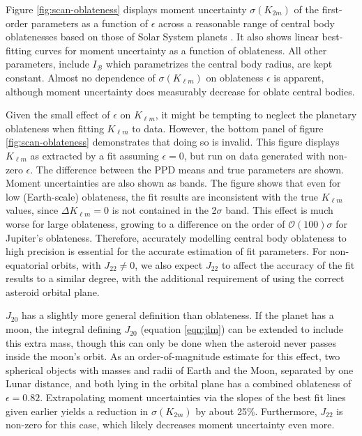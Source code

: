 \documentclass[fleqn,usenatbib]{mnras}
\begin{document}
Figure \ref{fig:scan-oblateness} displays moment uncertainty $\sigma(K_{2 m})$ of the first-order parameters as a function of $\epsilon$ across a reasonable range of central body oblatenesses based on those of Solar System planets \cite{paterLissauer2015}. It also shows linear best-fitting curves for moment uncertainty as a function of oblateness. All other parameters, include $I_\mathcal{B}$ which parametrizes the central body radius, are kept constant. Almost no dependence of $\sigma(K_{\ell m})$ on oblateness $\epsilon$ is apparent, although moment uncertainty does measurably decrease for oblate central bodies.

Given the small effect of $\epsilon$ on $K_{\ell m}$, it might be tempting to neglect the planetary oblateness when fitting $K_{\ell m}$ to data. However, the bottom panel of figure \ref{fig:scan-oblateness} demonstrates that doing so is invalid. This figure displays $K_{\ell m}$ as extracted by a fit assuming $\epsilon = 0$, but run on data generated with non-zero $\epsilon$. The difference between the PPD means and true parameters are shown. Moment uncertainties are also shown as bands. The figure shows that even for low (Earth-scale) oblateness, the fit results are inconsistent with the true $K_{\ell m}$ values, since $\Delta K_{\ell m} = 0$ is not contained in the 2$\sigma$ band. This effect is much worse for large oblateness, growing to a difference on the order of $\mathcal{O}(100)\sigma$ for Jupiter's oblateness. Therefore, accurately modelling central body oblateness to high precision is essential for the accurate estimation of fit parameters. For non-equatorial orbits, with $J_{22} \neq 0$, we also expect $J_{22}$ to affect the accuracy of the fit results to a similar degree, with the additional requirement of using the correct asteroid orbital plane.

$J_{20}$ has a slightly more general definition than oblateness. If the planet has a moon, the integral defining $J_{20}$ (equation \ref{eqn:jlm}) can be extended to include this extra mass, though this can only be done when the asteroid never passes inside the moon's orbit. As an order-of-magnitude estimate for this effect, two spherical objects with masses and radii of Earth and the Moon, separated by one Lunar distance, and both lying in the orbital plane has a combined oblateness of $\epsilon = 0.82$. Extrapolating moment uncertainties via the slopes of the best fit lines given earlier yields a reduction in $\sigma(K_{2m})$ by about 25\%. Furthermore, $J_{22}$ is non-zero for this case, which likely decreases moment uncertainty even more.
\end{document}
